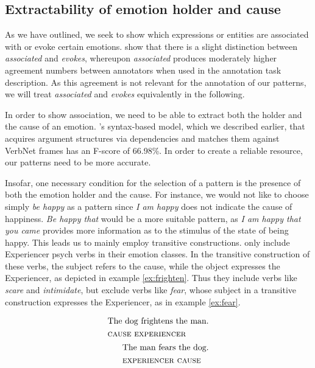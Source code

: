 \subsection{Extractability of emotion holder and cause} \label{sec:extractability}

As we have outlined, we seek to show which expressions or entities are associated with or evoke certain emotions. \citeauthor{nrc} show that there is a slight distinction between \textit{associated} and \textit{evokes}, whereupon \textit{associated} produces moderately higher agreement numbers between annotators when used in the annotation task description. As this agreement is not relevant for the annotation of our patterns, we will treat \textit{associated} and \textit{evokes} equivalently in the following.

In order to show association, we need to be able to extract both the holder and the cause of an emotion. \citeauthor{emotion_holder}'s syntax-based model, which we described earlier, that acquires argument structures via dependencies and matches them against VerbNet frames has an F-score of 66.98\%. In order to create a reliable resource, our patterns need to be more accurate.

Insofar, one necessary condition for the selection of a pattern is the presence of both the emotion holder and the cause. For instance, we would not like to choose simply \textit{be happy} as a pattern since \textit{I am happy} does not indicate the cause of happiness. \textit{Be happy that} would be a more suitable pattern, as \textit{I am happy that you came} provides more information as to the stimulus of the state of being happy.
This leads us to mainly employ transitive constructions. \citeauthor{emotion_verbs} only include Experiencer psych verbs in their emotion classes. In the transitive construction of these verbs, the subject refers to the cause, while the object expresses the Experiencer, as depicted in example \ref{ex:frighten}. Thus they include verbs like \textit{scare} and \textit{intimidate}, but exclude verbs like \textit{fear}, whose subject in a transitive construction expresses the Experiencer, as in example \ref{ex:fear}.

\begin{subequations}
\begin{align}
\begin{split}\label{ex:frighten}
&\textnormal{The dog frightens the man.}\\
&\textnormal{\textsc{cause}	\textsc{experiencer}}
\end{split}
\\
\begin{split}\label{ex:fear}
&\textnormal{The man fears the dog.}\\
&\textnormal{\textsc{experiencer}	\textsc{cause}}
\end{split}
\end{align}
\end{subequations}

